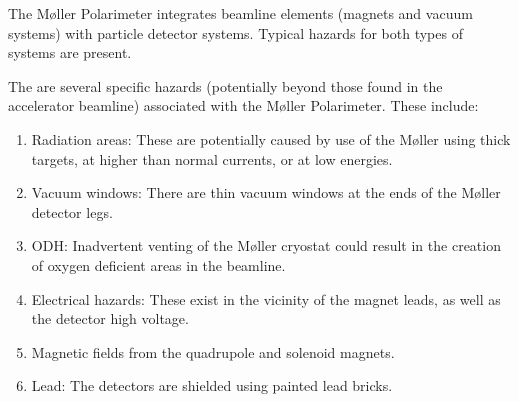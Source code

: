 \begin{safetyen}{0}{0}
%
%

The M\o ller Polarimeter integrates beamline elements (magnets and
vacuum systems) with particle detector systems. Typical hazards for
both types of systems are present.


The are several specific hazards (potentially beyond those found in
the accelerator beamline) associated with the M\o ller Polarimeter.
These include:
\begin{enumerate}
\item{Radiation areas: These are potentially caused by use of the M\o ller using thick targets, at higher than normal currents, or at low energies.}
\item{Vacuum windows: There are thin vacuum windows at the ends of the M\o ller detector legs.}
\item{ODH: Inadvertent venting of the M\o ller cryostat could result in the creation of oxygen deficient areas in the beamline.}
\item{Electrical hazards: These exist in the vicinity of the magnet leads, as well as the detector high voltage.}
\item{Magnetic fields from the quadrupole and solenoid magnets.}
\item{Lead: The detectors are shielded using painted lead bricks.}
\end{enumerate}



\end{safetyen}
